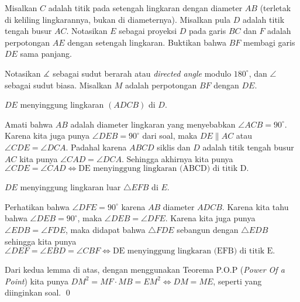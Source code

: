 \documentclass[11pt]{scrartcl}
\begin{document}
	\begin{soalbaru} 
		 Misalkan $C$ adalah titik pada setengah lingkaran dengan diameter $AB$ (terletak di keliling lingkarannya, bukan di diameternya). Misalkan pula $D$ adalah titik tengah busur $AC$. Notasikan $E$ sebagai proyeksi $D$ pada garis $BC$ dan $F$ adalah perpotongan $AE$ dengan setengah lingkaran. Buktikan bahwa $BF$ membagi garis $DE$ sama panjang.\\[-10pt]
		 
		 \begin{solusi}
		 Notasikan $\measuredangle$ sebagai sudut berarah atau \textit{ directed angle} modulo $180^\circ$, dan $\angle$ sebagai sudut biasa.
		 Misalkan $M$ adalah perpotongan $BF$ dengan $DE$.
		 \begin{lemmarev}
		 $DE$ menyinggung lingkaran $(ADCB)$ di $D$.
		 		 		 		 		 		 		 
             \begin{buktilemma}
                Amati bahwa $AB$ adalah diameter lingkaran yang menyebabkan $\angle ACB = 90^\circ$. Karena kita juga punya $\angle DEB=90^\circ$ dari soal, maka $DE \parallel AC$ atau $\angle CDE = \angle DCA$. Padahal karena $ABCD$ siklis dan $D$ adalah titik tengah busur $AC$ kita punya $\angle CAD = \angle DCA$. Sehingga akhirnya kita punya $\angle CDE = \angle CAD \iff \text{DE menyinggung lingkaran (ABCD) di titik D.}$
             \end{buktilemma}
		 		 		 		  
		 \end{lemmarev}

		 
		 \begin{lemmarev}
		 $DE$ menyinggung lingkaran luar $\triangle EFB$ di $E$.
		 		 		
            \begin{buktilemma}
                Perhatikan bahwa $\angle DFE = 90^\circ$ karena $AB$ diameter $ADCB$. Karena kita tahu bahwa $\angle DEB = 90^\circ$, maka $\angle DEB = \angle DFE$. Karena kita juga punya $\angle EDB = \angle FDE$, maka didapat bahwa $\triangle FDE$ sebangun dengan $\triangle EDB$ sehingga kita punya $\angle DEF= \angle EBD = \angle CBF \iff \text{DE menyinggung lingkaran (EFB) di titik E.}$
            \end{buktilemma}
		 		 		
		 \end{lemmarev}
		 	
		 Dari kedua lemma di atas, dengan menggunakan Teorema P.O.P (\textit{Power Of a Point}) kita punya $DM^2 = MF\cdot MB = EM^2 \iff DM = ME$, seperti yang diinginkan soal. \qed		 
		 		 		 
		 \end{solusi}
	\end{soalbaru}
	
\end{document}

